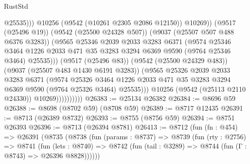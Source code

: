 \begin{lexlean}{RustStd}
\begin{coremodule}
                                      @25535)))
                                @10256
                                (@9542 (@10261 @2305 @2086 @12150))
                                @10269))
                            (@9517 (@25496 @19))
                            (@9542 (@25500 @24328 @507))
                            (@9037 (@25507 @507 @488 @6376 @3283))
                            (@9565
                              @25346
                              @2039
                              @2033
                              @3283
                              @6371
                              (@9574
                                @25346
                                @3464
                                @1226
                                @2033
                                @471
                                @35
                                @3283
                                @3294
                                @6369
                                @9590
                                (@9764 @25346 @3464)
                                @25535)))
                          (@9517 (@25496 @83))
                          (@9542 (@25500 @24329 @483))
                          (@9037 (@25507 @483 @1430 @6191 @3283))
                          (@9565
                            @25326
                            @2039
                            @2033
                            @3283
                            @6371
                            (@9574
                              @25326
                              @3464
                              @1226
                              @2033
                              @471
                              @35
                              @3283
                              @3294
                              @6369
                              @9590
                              (@9764 @25326 @3464)
                              @25535)))
                        @10256
                        (@9542 (@25113 @2110 @24330))
                        @10269))))))))))
@26383 := @25134 @26382
@26384 := @8696 @59
@26388 := @8698 (@8702 @59) (@8708 @59)
@26389 := @8717 @12435
@26391 := @8713 (@26389 @8732)
@26393 := @8755 (@8756 @59)
@26394 := @8751 @26393
@26396 := @8713 (@26394 @8781)
@26413 := @8712
    (fun (fn : @454) =>
    @26391
      (@8735
        (@8738
          (fun (params : @8737) =>
          @8739
            (fun (rty : @2756) =>
            @8741
              (fun (lets : @8740) =>
              @8742 (fun (tail : @3289) => @8744 (fun (Γ : @8743) => @26396 @8828))))))

\end{coremodule}
\end{lexlean}
